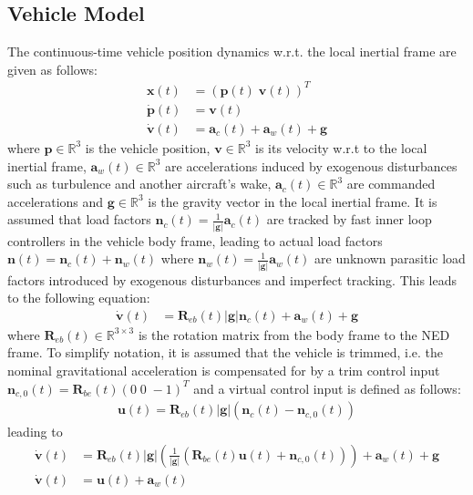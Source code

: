 \documentclass{ifacconf}
\providecommand{\mbf}[1]{\mathbf{#1}}
\begin{document}
\subsection{Vehicle Model}
The continuous-time vehicle position dynamics w.r.t. the local inertial frame are given as follows:
\begin{align}
\mathbf{x}(t) &= (\mbf{p}(t) \; \mbf{v}(t))^T \\
\dot{\mathbf{p}}(t) &= \mbf{v}(t)\\
\dot{\mbf{v}}(t) &= \mbf{a}_{c}(t) + \mbf{a}_w(t) + \mbf{g}
\end{align}
where $\mbf{p} \in \mathbb{R}^3$ is the vehicle position, $\mbf{v} \in \mathbb{R}^3$ is its velocity w.r.t to the local inertial frame, $\mbf{a}_w(t) \in \mathbb{R}^3$ are accelerations induced by exogenous disturbances such as turbulence and another aircraft's wake, $\mbf{a}_{c}(t) \in \mathbb{R}^3$ are commanded accelerations and $\mbf{g} \in \mathbb{R}^3$ is the gravity vector in the local inertial frame.
It is assumed that load factors $\mbf{n}_c(t) = \frac{1}{|\mbf{g}|} \mbf{a}_c(t)$ are tracked by fast inner loop controllers in the vehicle body frame, leading to actual load factors $\mbf{n}(t) = \mbf{n}_c(t) + \mbf{n}_w(t)$ where $\mbf{n}_w(t) = \frac{1}{|\mbf{g}|} \mbf{a}_w(t)$ are unknown parasitic load factors introduced by exogenous disturbances and imperfect tracking. This leads to the following equation:
\begin{align}
\dot{\mbf{v}}(t) &= \mbf{R}_{eb}(t) |\mbf{g}|\mbf{n}_c(t) + \mbf{a}_w(t) + \mbf{g}
\label{eq:svmloadfactorlevel}
\end{align}
where $\mbf{R}_{eb}(t) \in \mathbb{R}^{3 \times 3}$ is the rotation matrix from the body frame to the NED frame. To simplify notation, it is assumed that the vehicle is trimmed, i.e. the nominal gravitational acceleration is compensated for by a trim control input $\mbf{n}_{c,0}(t) = \mbf{R}_{be}(t)(0 \; 0 \; -1)^{T}$ and a virtual control input is defined as follows:
\begin{align}
\mbf{u} (t)= \mbf{R}_{eb}(t) |\mbf{g}|(\mbf{n}_c(t) - \mbf{n}_{c,0}(t))	
\label{eq:defushort}
\end{align}
leading to
\begin{align}
\dot{\mbf{v}}(t) &= \mbf{R}_{eb}(t)|\mbf{g}|
(
\frac{1}{|\mbf{g}|}
(\mbf{R}_{be}(t) \mbf{u}(t) + \mbf{n}_{c,0}(t))
) + \mbf{a}_w(t) + \mbf{g}\\
\dot{\mbf{v}}(t) &= \mbf{u}(t) + \mbf{a}_w(t)
\label{eq:svmshort}
\end{align}
\end{document}
